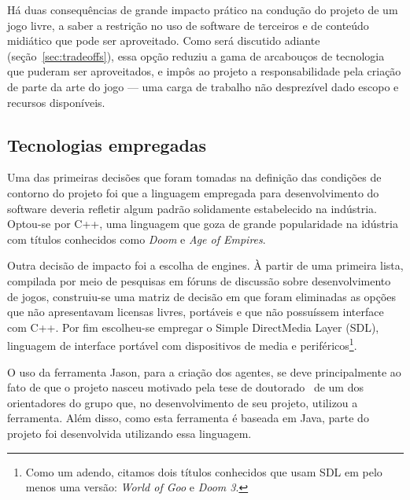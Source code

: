 Há duas consequências de grande impacto prático na condução do projeto de um jogo livre,  a saber a restrição no uso de software de terceiros e de conteúdo midiático que pode ser aproveitado. Como será discutido adiante (seção~\ref{sec:tradeoffs}), essa opção reduziu a gama de arcabouços de tecnologia que puderam ser aproveitados, e impôs ao projeto a responsabilidade pela criação de parte da arte do jogo --- uma carga de trabalho não desprezível dado escopo e recursos disponíveis.  

\subsection{Tecnologias empregadas}\label{tecnologias_empregadas}

Uma das primeiras decisões que foram tomadas na definição das condições de contorno do projeto foi que a linguagem empregada para desenvolvimento do software deveria refletir algum padrão solidamente estabelecido na indústria. Optou-se por C++, uma linguagem que goza de grande popularidade na idústria com títulos conhecidos como \emph{Doom} e \emph{Age of Empires}.

Outra decisão de impacto foi a escolha de engines. À partir de uma primeira lista, compilada por meio de pesquisas em fóruns de discussão sobre desenvolvimento de jogos, construiu-se uma matriz de decisão em que foram eliminadas as opções que não apresentavam licensas livres, portáveis e que não possuíssem interface com C++. Por fim escolheu-se empregar o Simple DirectMedia Layer (SDL), linguagem de interface portável com dispositivos de media e periféricos\footnote{Como um adendo, citamos dois títulos conhecidos que usam SDL em pelo menos uma versão: \emph{World of Goo} e \emph{Doom 3}.}.

O uso da ferramenta Jason, para a criação dos agentes, se deve principalmente ao fato de que o projeto nasceu motivado pela tese de doutorado~\cite{tese_roberto} de um dos orientadores do grupo que, no desenvolvimento de seu projeto, utilizou a ferramenta. Além disso, como esta ferramenta é baseada em Java, parte do projeto foi desenvolvida utilizando essa linguagem.



